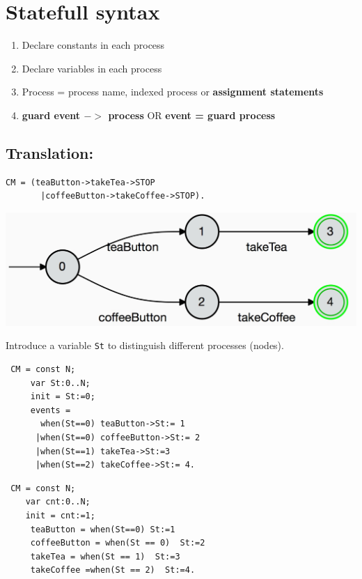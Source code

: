 \documentclass[]{article}
\begin{document}
\newpage
{\color{red}
\section{Statefull syntax}
\begin{enumerate}
\item Declare constants in each process
\item Declare variables in each process
\item Process = process name, indexed process or {\bf assignment statements}
\item {\bf guard event $->$ process} OR  {\bf event = guard  process}
\end{enumerate}

\subsection{Translation:}

\begin{center}  \begin{minipage}{0.5\textwidth}
\begin{verbatim}CM = (teaButton->takeTea->STOP
       |coffeeButton->takeCoffee->STOP).\end{verbatim} 
\end{minipage}
\begin{minipage}{0.45\textwidth}\includegraphics[scale=0.15]{CM.jpg}
\end{minipage}\end{center}

Introduce a variable \verb|St| to distinguish different processes (nodes).

\noindent\begin{minipage}{0.5\textwidth}
 \begin{verbatim}
 CM = const N;
     var St:0..N;
     init = St:=0;
     events =
       when(St==0) teaButton->St:= 1 
      |when(St==0) coffeeButton->St:= 2
      |when(St==1) takeTea->St:=3
      |when(St==2) takeCoffee->St:= 4.
 \end{verbatim} 
 \end{minipage} 
 \begin{minipage}{0.45\textwidth}
 \begin{verbatim}
 CM = const N;
    var cnt:0..N;
    init = cnt:=1;
     teaButton = when(St==0) St:=1 
     coffeeButton = when(St == 0)  St:=2
     takeTea = when(St == 1)  St:=3
     takeCoffee =when(St == 2)  St:=4.
   \end{verbatim} 
 

\end{minipage}}
\end{document}
